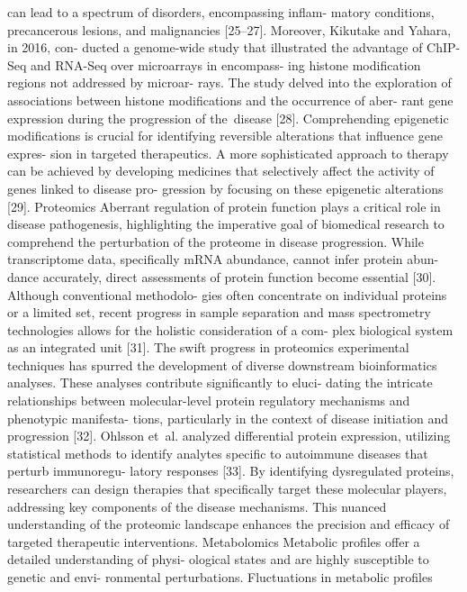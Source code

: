 can lead to a spectrum of disorders, encompassing inflam-
matory conditions, precancerous lesions, and malignancies
[25–27]. Moreover, Kikutake and Yahara, in 2016, con-
ducted a genome-wide study that illustrated the advantage
of ChIP-Seq and RNA-Seq over microarrays in encompass-
ing histone modification regions not addressed by microar-
rays. The study delved into the exploration of associations
between histone modifications and the occurrence of aber-
rant gene expression during the progression of the disease
[28]. Comprehending epigenetic modifications is crucial for
identifying reversible alterations that influence gene expres-
sion in targeted therapeutics. A more sophisticated approach
to therapy can be achieved by developing medicines that
selectively affect the activity of genes linked to disease pro-
gression by focusing on these epigenetic alterations [29].
Proteomics
Aberrant regulation of protein function plays a critical role
in disease pathogenesis, highlighting the imperative goal of
biomedical research to comprehend the perturbation of the
proteome in disease progression. While transcriptome data,
specifically mRNA abundance, cannot infer protein abun-
dance accurately, direct assessments of protein function
become essential [30]. Although conventional methodolo-
gies often concentrate on individual proteins or a limited set,
recent progress in sample separation and mass spectrometry
technologies allows for the holistic consideration of a com-
plex biological system as an integrated unit [31]. The swift
progress in proteomics experimental techniques has spurred
the development of diverse downstream bioinformatics
analyses. These analyses contribute significantly to eluci-
dating the intricate relationships between molecular-level
protein regulatory mechanisms and phenotypic manifesta-
tions, particularly in the context of disease initiation and
progression [32]. Ohlsson et al. analyzed differential protein
expression, utilizing statistical methods to identify analytes
specific to autoimmune diseases that perturb immunoregu-
latory responses [33]. By identifying dysregulated proteins,
researchers can design therapies that specifically target these
molecular players, addressing key components of the disease
mechanisms. This nuanced understanding of the proteomic
landscape enhances the precision and efficacy of targeted
therapeutic interventions.
Metabolomics
Metabolic profiles offer a detailed understanding of physi-
ological states and are highly susceptible to genetic and envi-
ronmental perturbations. Fluctuations in metabolic profiles
